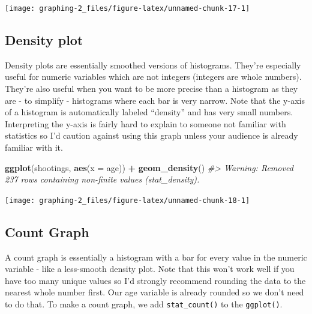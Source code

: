 \documentclass[
  12pt,
]{book}
\newenvironment{Shaded}{\begin{snugshade}}{\end{snugshade}}
\newcommand{\CommentTok}[1]{\textcolor[rgb]{0.56,0.35,0.01}{\textit{#1}}}
\newcommand{\DataTypeTok}[1]{\textcolor[rgb]{0.13,0.29,0.53}{#1}}
\newcommand{\KeywordTok}[1]{\textcolor[rgb]{0.13,0.29,0.53}{\textbf{#1}}}
\newcommand{\NormalTok}[1]{#1}
\newcommand{\OperatorTok}[1]{\textcolor[rgb]{0.81,0.36,0.00}{\textbf{#1}}}
\newcommand{\StringTok}[1]{\textcolor[rgb]{0.31,0.60,0.02}{#1}}
\begin{document}
\begin{center}\texttt{[image: graphing-2\_files/figure-latex/unnamed-chunk-17-1]} \end{center}

\hypertarget{density-plot}{%
\subsection{Density plot}\label{density-plot}}

Density plots are essentially smoothed versions of histograms. They're especially useful for numeric variables which are not integers (integers are whole numbers). They're also useful when you want to be more precise than a histogram as they are - to simplify - histograms where each bar is very narrow. Note that the y-axis of a histogram is automatically labeled ``density'' and has very small numbers. Interpreting the y-axis is fairly hard to explain to someone not familiar with statistics so I'd caution against using this graph unless your audience is already familiar with it.

\begin{Shaded}
\begin{Highlighting}[]
\KeywordTok{ggplot}\NormalTok{(shootings, }\KeywordTok{aes}\NormalTok{(}\DataTypeTok{x =}\NormalTok{ age)) }\OperatorTok{+}\StringTok{ }
\StringTok{  }\KeywordTok{geom\_density}\NormalTok{()}
\CommentTok{\#> Warning: Removed 237 rows containing non{-}finite values (stat\_density).}
\end{Highlighting}
\end{Shaded}

\begin{center}\texttt{[image: graphing-2\_files/figure-latex/unnamed-chunk-18-1]} \end{center}

\hypertarget{count-graph}{%
\subsection{Count Graph}\label{count-graph}}

A count graph is essentially a histogram with a bar for every value in the numeric variable - like a less-smooth density plot. Note that this won't work well if you have too many unique values so I'd strongly recommend rounding the data to the nearest whole number first. Our age variable is already rounded so we don't need to do that. To make a count graph, we add \texttt{stat\_count()} to the \texttt{ggplot()}.
\end{document}
